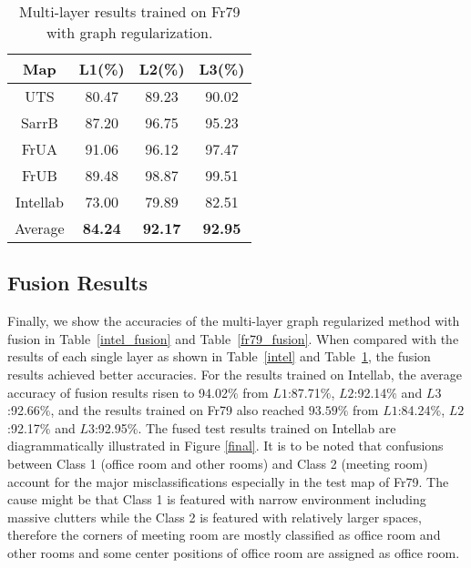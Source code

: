 \documentclass[letterpaper, 10 pt, conference]{ieeeconf}  %
\begin{document}
\begin{table}[pb]
\caption{Multi-layer results trained on Fr79 with graph regularization.}
\label{fr79}
\begin{center}
\begin{tabular}{cccc}
Map     &L1(\%)     &L2(\%)     &L3(\%)   \\
\hline
UTS     &80.47	    &89.23	    &90.02\\
SarrB   &87.20	    &96.75      &95.23\\
FrUA    &91.06	    &96.12	    &97.47\\
FrUB    &89.48	    &98.87	    &99.51\\
Intellab    &73.00	    &79.89	    &82.51\\
Average     &\textbf{84.24}	    &\textbf{92.17}	    &\textbf{92.95}\\
\end{tabular}
\end{center}
\end{table}


\subsection{Fusion Results}
Finally, we show the accuracies of the multi-layer graph regularized method with fusion in Table~\ref{intel_fusion} and Table~\ref{fr79_fusion}. When compared with the results of each single layer as shown in Table~\ref{intel} and Table~\ref{fr79}, the fusion results achieved better accuracies. For the results trained on Intellab, the average accuracy of fusion results risen to 94.02$\%$ from  $L1$:87.71$\%$, $L2$:92.14$\%$ and $L3$:92.66$\%$, and the results trained on Fr79 also reached $93.59\%$ from $L1$:84.24$\%$, $L2$:92.17$\%$ and $L3$:92.95$\%$. The fused test results trained on Intellab are diagrammatically illustrated in Figure \ref{final}. It is to be noted that confusions between Class 1 (office room and other rooms) and Class 2 (meeting room) account for the major misclassifications especially in the test map of Fr79. The cause might be that Class 1 is featured with narrow environment including massive clutters while the Class 2 is featured with relatively larger spaces, therefore the corners of meeting room are mostly classified as office room and other rooms and some center positions of office room are assigned as office room.
\end{document}
